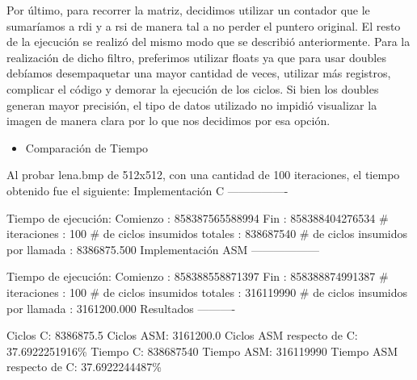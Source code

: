 \documentclass[10pt, a4paper]{article}
\begin{document}
\begin{itemize}
Por último, para recorrer la matriz, decidimos utilizar un contador que le sumaríamos a rdi y a rsi de manera tal a no perder el puntero original. El resto de la ejecución se realizó del mismo modo que se describió anteriormente.\newline
Para la realización de dicho filtro, preferimos utilizar floats ya que para usar doubles debíamos desempaquetar una mayor cantidad de veces, utilizar más registros, complicar el código y demorar la ejecución de los ciclos. Si bien los doubles generan mayor precisión, el tipo de datos utilizado no impidió visualizar la imagen de manera clara por lo que nos decidimos por esa opción.

\begin{itemize}
\item{Comparación de Tiempo}
\end{itemize}
Al probar lena.bmp de 512x512, con una cantidad de 100 iteraciones, el tiempo obtenido fue el siguiente:\newline
Implementación C\newline
----------------

Tiempo de ejecución:\newline
  Comienzo                          : 858387565588994\newline
  Fin                               : 858388404276534\newline
  \# iteraciones                     : 100\newline
  \# de ciclos insumidos totales     : 838687540\newline
  \# de ciclos insumidos por llamada : 8386875.500\newline
\newline
Implementación ASM\newline
------------------

Tiempo de ejecución:\newline
  Comienzo                          : 858388558871397\newline
  Fin                               : 858388874991387\newline
  \# iteraciones                     : 100\newline
  \# de ciclos insumidos totales     : 316119990\newline
  \# de ciclos insumidos por llamada : 3161200.000\newline
\newline
Resultados\newline
----------

Ciclos C:                 8386875.5\newline
Ciclos ASM:               3161200.0\newline
Ciclos ASM respecto de C: 37.6922251916\%\newline
Tiempo C:                 838687540\newline
Tiempo ASM:               316119990\newline
Tiempo ASM respecto de C: 37.6922244487\%\newline


\end{itemize}
\end{document}
